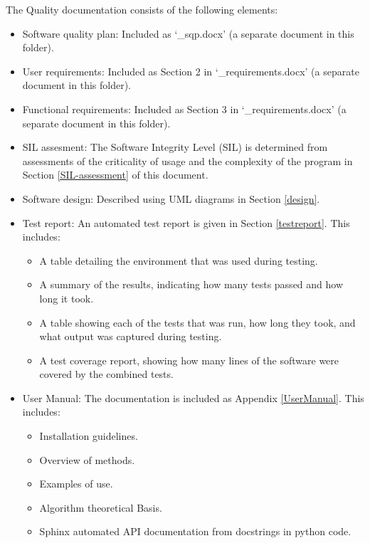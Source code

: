 \documentclass{article}
\begin{document}
The Quality documentation consists of the following elements:
\begin{itemize}
\item Software quality plan: Included as `\packagename\_sqp.docx' (a separate document in this folder).

\item User requirements: Included as Section 2 in `\packagename\_requirements.docx' (a separate document in this folder).

\item Functional requirements: Included as Section 3 in `\packagename\_requirements.docx' (a separate document in this folder).

\item SIL assesment: The Software Integrity Level (SIL) is determined from assessments of the criticality of usage and the complexity of the program in Section \ref{SIL-assessment} of this document.

\item Software design: Described using UML diagrams in Section \ref{design}.

\item Test report: An automated test report is given in Section \ref{testreport}. This includes:
\begin{itemize}
\item A table detailing the environment that was used during testing.
\item A summary of the results, indicating how many tests passed and how long it took.
\item A table showing each of the tests that was run, how long they took, and what output was captured during testing.
\item A test coverage report, showing how many lines of the software were covered by the combined tests.
\end{itemize}
\item User Manual: The \packagename documentation is included as Appendix \ref{UserManual}. This includes:
\begin{itemize}
\item Installation guidelines.
\item Overview of methods.
\item Examples of use.
\item Algorithm theoretical Basis.
\item Sphinx automated API documentation from docstrings in python code.
\end{itemize}
\end{itemize}
\end{document}
